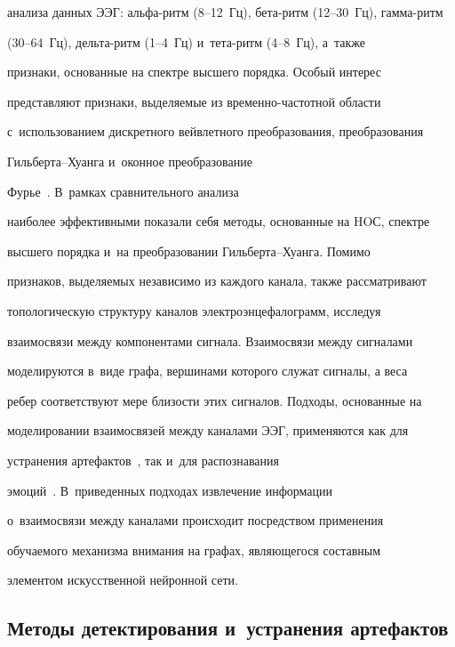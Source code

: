 анализа данных ЭЭГ: аль\-фа-ритм (8--12~Гц), бе\-та-ритм (12--30~Гц), гам\-ма-ритм 

(30--64~Гц), дель\-та-ритм (1--4~Гц) и~те\-та-ритм (4--8~Гц), а~также 

признаки, основанные на спектре высшего порядка. Особый интерес 

представляют признаки, выделяемые из вре\-мен\-но-час\-тот\-ной области 

с~использованием дискретного вейвлетного преобразования, преобразования 

Гиль\-бер\-та--Хуан\-га и~оконное преобразование  

Фурье~\cite[разд.~2.2--2.3]{5-sha}. В~рамках сравнительного анализа 

наиболее эффективными показали себя методы, основанные на HOС, спектре 

высшего порядка и~на преобразовании Гиль\-бер\-та--Хуан\-га. Помимо 

признаков, выделяемых независимо из каждого канала, также рассматривают 

топологическую структуру каналов электроэнцефалограмм, исследуя 

взаимосвязи между компонентами сигнала. Взаимосвязи между сигналами 

моделируются в~виде графа, вершинами которого служат сигналы, а веса 

ребер соответствуют мере близости этих сигналов. Подходы, основанные на 

моделировании взаимосвязей между каналами ЭЭГ, применяются как для 

устранения артефактов~\cite{6-sha}, так и~для распознавания  

эмоций~\cite{7-sha}. В~приведенных подходах извлечение информации 

о~взаимосвязи между каналами происходит посредством применения 

обучаемого механизма внимания на графах, являющегося составным 

элементом искусственной нейронной сети.



\vspace*{-2pt}



\subsection{Методы детектирования и~устранения артефактов}

